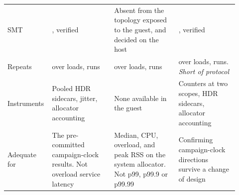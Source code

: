 \documentclass[english,oneside,a4paper,censored,csm,software-track-2020]{HYthesisML}
\begin{document}
\begin{appendices}
\begin{table}[!ht]
\begin{tabular}{@{}R{0.14\linewidth} R{0.26\linewidth} R{0.27\linewidth} R{0.25\linewidth}@{}}
SMT & \MainSmt{}, verified & Absent from the topology exposed to the guest, and decided on the host & \BmSmt{}, verified \\
Repeats & \NRepeats{} over \NLoadLevels{} loads, \NRuns{} runs & \GuestRepeats{} over \GuestLoadLevels{} loads, \GuestRuns{} runs & \BmRepeats{} over \BmLoadLevels{} loads, \BmRuns{} runs. \emph{Short of protocol} \\
Instruments & Pooled HDR sidecars, jitter, allocator accounting & None available in the guest & Counters at two scopes, HDR sidecars, allocator accounting \\
\hline
Adequate for & The pre-committed campaign-clock results. Not overload service latency & Median, CPU, overload, and peak RSS on the system allocator. Not p99, p99.9 or p99.99 & Confirming campaign-clock directions survive a change of design \\
\hline
\end{tabular}
\end{table}


\end{appendices}
\end{document}
